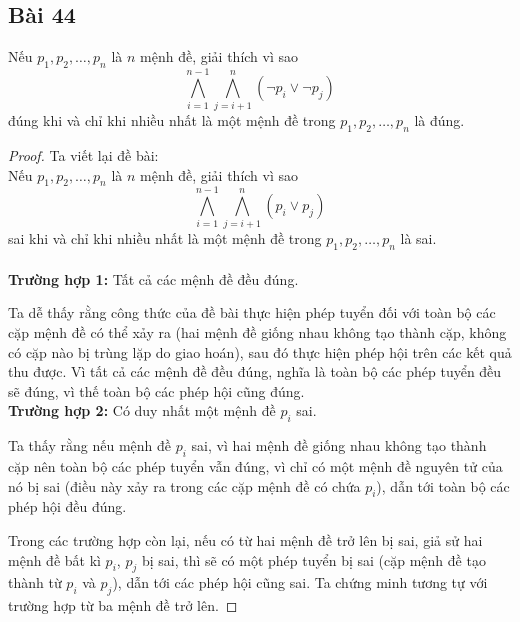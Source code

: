 \subsection*{Bài 44}
Nếu $p_1,p_2,\dots,p_n$ là $n$ mệnh đề, giải thích vì sao
$$\bigwedge_{i=1}^{n-1}\bigwedge_{j=i+1}^{n}(\neg p_i\lor\neg p_j)$$ đúng khi và chỉ khi nhiều nhất là một mệnh đề trong $p_1,p_2,\dots,p_n$ là đúng.
\begin{proof}
    \par Ta viết lại đề bài:\\
    Nếu $p_1,p_2,\dots,p_n$ là $n$ mệnh đề, giải thích vì sao
$$\bigwedge_{i=1}^{n-1}\bigwedge_{j=i+1}^{n}(p_i\lor p_j)$$ sai khi và chỉ khi nhiều nhất là một mệnh đề trong $p_1,p_2,\dots,p_n$ là sai.\\\\
\textbf{Trường hợp 1:} Tất cả các mệnh đề đều đúng.
\par Ta dễ thấy rằng công thức của đề bài thực hiện phép tuyển đối với toàn bộ các cặp mệnh đề có thể xảy ra (hai mệnh đề giống nhau không tạo thành cặp, không có cặp nào bị trùng lặp do giao hoán), sau đó thực hiện phép hội trên các kết quả thu được. Vì tất cả các mệnh đề đều đúng, nghĩa là toàn bộ các phép tuyển đều sẽ đúng, vì thế toàn bộ các phép hội cũng đúng.\\
\textbf{Trường hợp 2:} Có duy nhất một mệnh đề $p_i$ sai.
\par Ta thấy rằng nếu mệnh đề $p_i$ sai, vì hai mệnh đề giống nhau không tạo thành cặp nên toàn bộ các phép tuyển vẫn đúng, vì chỉ có một mệnh đề nguyên tử của nó bị sai (điều này xảy ra trong các cặp mệnh đề có chứa $p_i$), dẫn tới toàn bộ các phép hội đều đúng.\\
\par Trong các trường hợp còn lại, nếu có từ hai mệnh đề trở lên bị sai, giả sử hai mệnh đề bất kì $p_i$, $p_j$ bị sai, thì sẽ có một phép tuyển bị sai (cặp mệnh đề tạo thành từ $p_i$ và $p_j$), dẫn tới các phép hội cũng sai. Ta chứng minh tương tự với trường hợp từ ba mệnh đề trở lên.
\end{proof}
